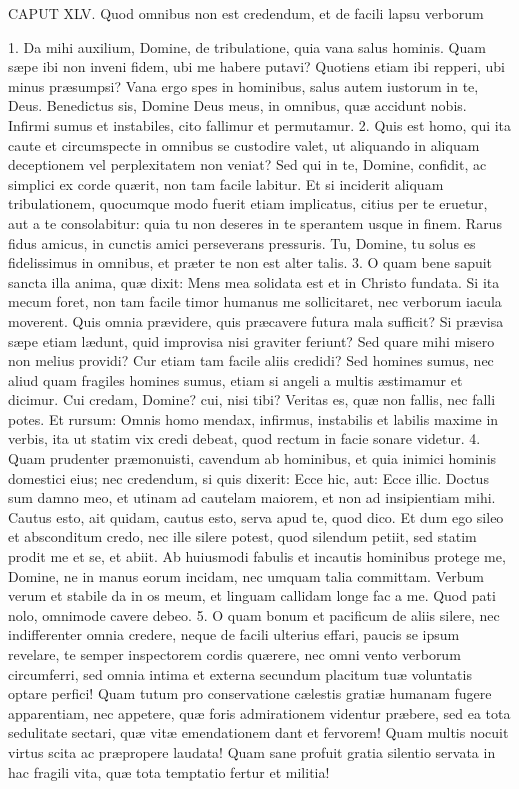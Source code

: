 CAPUT XLV.
Quod omnibus non est credendum, et de facili lapsu verborum

1. Da mihi auxilium, Domine, de tribulatione, quia vana salus hominis. Quam sæpe ibi non inveni fidem, ubi me habere putavi? Quotiens etiam ibi repperi, ubi minus præsumpsi? Vana ergo spes in hominibus, salus autem iustorum in te, Deus. Benedictus sis, Domine Deus meus, in omnibus, quæ accidunt nobis. Infirmi sumus et instabiles, cito fallimur et permutamur.
2. Quis est homo, qui ita caute et circumspecte in omnibus se custodire valet, ut aliquando in aliquam deceptionem vel perplexitatem non veniat? Sed qui in te, Domine, confidit, ac simplici ex corde quærit, non tam facile labitur. Et si inciderit aliquam tribulationem, quocumque modo fuerit etiam implicatus, citius per te eruetur, aut a te consolabitur: quia tu non deseres in te sperantem usque in finem. Rarus fidus amicus, in cunctis amici perseverans pressuris. Tu, Domine, tu solus es fidelissimus in omnibus, et præter te non est alter talis.
3. O quam bene sapuit sancta illa anima, quæ dixit: Mens mea solidata est et in Christo fundata. Si ita mecum foret, non tam facile timor humanus me sollicitaret, nec verborum iacula moverent. Quis omnia prævidere, quis præcavere futura mala sufficit? Si prævisa sæpe etiam lædunt, quid improvisa nisi graviter feriunt? Sed quare mihi misero non melius providi? Cur etiam tam facile aliis credidi? Sed homines sumus, nec aliud quam fragiles homines sumus, etiam si angeli a multis æstimamur et dicimur. Cui credam, Domine? cui, nisi tibi? Veritas es, quæ non fallis, nec falli potes. Et rursum: Omnis homo mendax, infirmus, instabilis et labilis maxime in verbis, ita ut statim vix credi debeat, quod rectum in facie sonare videtur.
4. Quam prudenter præmonuisti, cavendum ab hominibus, et quia inimici hominis domestici eius; nec credendum, si quis dixerit: Ecce hic, aut: Ecce illic. Doctus sum damno meo, et utinam ad cautelam maiorem, et non ad insipientiam mihi. Cautus esto, ait quidam, cautus esto, serva apud te, quod dico. Et dum ego sileo et absconditum credo, nec ille silere potest, quod silendum petiit, sed statim prodit me et se, et abiit. Ab huiusmodi fabulis et incautis hominibus protege me, Domine, ne in manus eorum incidam, nec umquam talia committam. Verbum verum et stabile da in os meum, et linguam callidam longe fac a me. Quod pati nolo, omnimode cavere debeo.
5. O quam bonum et pacificum de aliis silere, nec indifferenter omnia credere, neque de facili ulterius effari, paucis se ipsum revelare, te semper inspectorem cordis quærere, nec omni vento verborum circumferri, sed omnia intima et externa secundum placitum tuæ voluntatis optare perfici! Quam tutum pro conservatione cælestis gratiæ humanam fugere apparentiam, nec appetere, quæ foris admirationem videntur præbere, sed ea tota sedulitate sectari, quæ vitæ emendationem dant et fervorem! Quam multis nocuit virtus scita ac præpropere laudata! Quam sane profuit gratia silentio servata in hac fragili vita, quæ tota temptatio fertur et militia!


